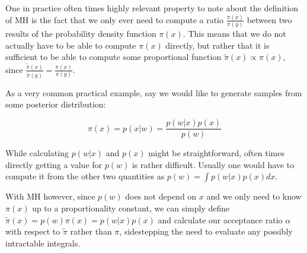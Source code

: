 One in practice often times highly relevant property to note about the definition of MH is the fact that we only ever need to compute a ratio $\frac{\pi(x)}{\pi(y)}$ between two results of the probability density function $\pi(x)$. This means that we do not actually have to be able to compute $\pi(x)$ directly, but rather that it is sufficient to be able to compute some proportional function $\tilde{\pi}(x) \propto \pi(x)$, since $\frac{\tilde{\pi}(x)}{\tilde{\pi}(y)} = \frac{\pi(x)}{\pi(y)}$.

As a very common practical example, say we would like to generate samples from some posterior distribution:

\begin{equation*}
\pi(x) = p(x | w) = \frac{p(w | x) p(x)}{p(w)}
\end{equation*}

While calculating $p(w | x)$ and $p(x)$ might be straightforward, often times directly getting a value for $p(w)$ is rather difficult. Usually one would have to compute it from the other two quantities as $p(w) = \int p(w | x) p(x) dx$.

With MH however, since $p(w)$ does not depend on $x$ and we only need to know $\pi(x)$ up to a proportionality constant, we can simply define $\tilde{\pi}(x) = p(w) \pi(x) = p(w | x) p(x)$ and calculate our acceptance ratio $\alpha$ with respect to $\tilde{\pi}$ rather than $\pi$, sidestepping the need to evaluate any possibly intractable integrals.
